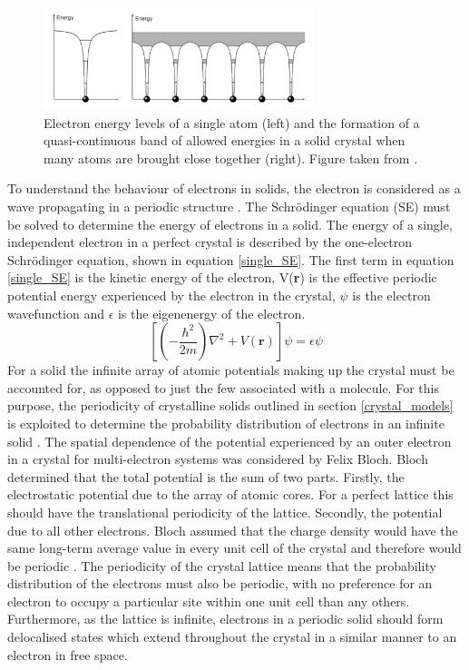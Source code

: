 \documentclass[11pt, twoside]{report}
\begin{document}
\begin{figure}[h!]
  \centering
    \includegraphics[width=0.7\textwidth]{figures/band_Elevels.png}
    \caption{Electron energy levels of a single atom (left) and the formation of a quasi-continuous band of allowed energies in a solid crystal when many atoms are brought close together (right). Figure taken from .}
  \label{band_Elevels}
\end{figure}

To understand the behaviour of electrons in solids, the electron is considered as a wave propagating in a periodic structure \cite{small_semiconductor1}. The Schr{\"o}dinger equation (SE) must be solved to determine the energy of electrons in a solid. 
The energy of a single, independent electron in a perfect crystal is described by the one-electron Schr{\"o}dinger equation, shown in equation \ref{single_SE}. The first term in equation \ref{single_SE} is the kinetic energy of the electron, V(\textbf{r}) is the effective periodic potential energy experienced by the electron in the crystal, $\psi$ is the electron wavefunction and $\epsilon$ is the eigenenergy of the electron.
\begin{equation} \label{single_SE}
\left[ \left(-\frac{\hbar^2}{2m}\right)\nabla^2 + V(\mathbf{r})\right]\psi = \epsilon \psi 
\end{equation}
For a solid the infinite array of atomic potentials making up the crystal must be accounted for, as opposed to just the few associated with a molecule. For this purpose, the periodicity of crystalline solids outlined in section \ref{crystal_models} is exploited to determine the probability distribution of electrons in an infinite solid \cite{Nelson3}. 
The spatial dependence of the potential experienced by an outer electron in a crystal for multi-electron systems was considered by Felix Bloch. Bloch determined that the total potential is the sum of two parts. Firstly, the electrostatic potential due to the array of atomic cores. For a perfect lattice this should have the translational periodicity of the lattice. Secondly, the potential due to all other electrons. Bloch assumed that the charge density would have the same long-term average value in every unit cell of the crystal and therefore would be periodic \cite{fund_semi}.
The periodicity of the crystal lattice means that the probability distribution of the electrons must also be periodic, with no preference for an electron to occupy a particular site within one unit cell than any others. Furthermore, as the lattice is infinite, electrons in a periodic solid should form delocalised states which extend throughout the crystal in a similar manner to an electron in free space.
\end{document}
